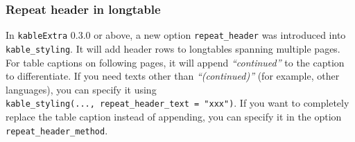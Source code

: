 \documentclass[table]{article}
\newenvironment{Shaded}{\begin{snugshade}}{\end{snugshade}}
\newcommand{\DataTypeTok}[1]{\textcolor[rgb]{0.13,0.29,0.53}{#1}}
\newcommand{\DecValTok}[1]{\textcolor[rgb]{0.00,0.00,0.81}{#1}}
\newcommand{\KeywordTok}[1]{\textcolor[rgb]{0.13,0.29,0.53}{\textbf{#1}}}
\newcommand{\NormalTok}[1]{#1}
\newcommand{\OperatorTok}[1]{\textcolor[rgb]{0.81,0.36,0.00}{\textbf{#1}}}
\newcommand{\StringTok}[1]{\textcolor[rgb]{0.31,0.60,0.02}{#1}}
\begin{document}
\begin{table}[H]
\centering{}

\end{table}

\hypertarget{repeat-header-in-longtable}{%
\subsubsection{Repeat header in
longtable}\label{repeat-header-in-longtable}}

In \texttt{kableExtra} 0.3.0 or above, a new option
\texttt{repeat\_header} was introduced into \texttt{kable\_styling}. It
will add header rows to longtables spanning multiple pages. For table
captions on following pages, it will append \emph{``continued''} to the
caption to differentiate. If you need texts other than
\emph{``(continued)''} (for example, other languages), you can specify
it using \texttt{kable\_styling(...,\ repeat\_header\_text\ =\ "xxx")}.
If you want to completely replace the table caption instead of
appending, you can specify it in the option
\texttt{repeat\_header\_method}.

\begin{Shaded}
\end{Shaded}
\end{document}
